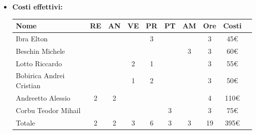 \begin{itemize}
        
    \item \textbf{Costi effettivi:}
    \begin{longtable}{|p{}|c|c|c|c|c|c|c|c|c|}
        \hline
        Nome & RE & AN & VE & PR & PT & AM & Ore & Costi\\
        \hline
        Ibra \newline Elton & & & &3 & & &3 & 45€\\
        \hline
        Beschin Michele & & & & & &3 &3 & 60€\\
        \hline
        Lotto \newline Riccardo & & &2 &1 & & &3 & 55€\\
        \hline
        Bobirica Andrei Cristian & & &1 &2 & & &3 &  50€\\
        \hline
        Andreetto Alessio &2 &2 & & & & &4 & 110€\\
        \hline
        Corbu Teodor Mihail & & & & &3 & &3 & 75€\\
        \hline
        Totale &2 &2 &3 &6 &3 &3 &19 & 395€\\
        \hline
    \end{longtable}
    \end{itemize}

